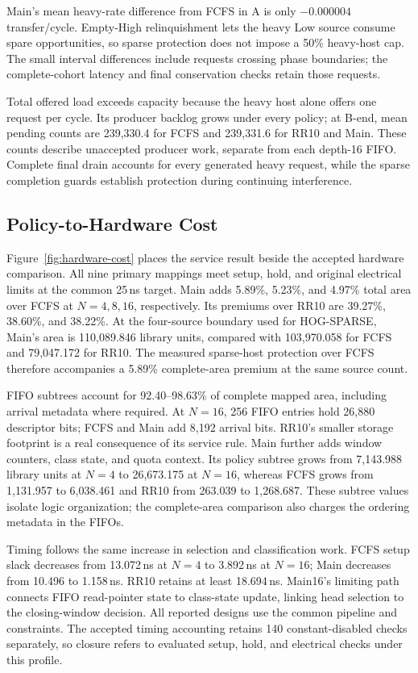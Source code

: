 Main's mean heavy-rate difference from FCFS in A is only $-0.000004$
transfer/cycle. Empty-High relinquishment lets the heavy Low source consume
spare opportunities, so sparse protection does not impose a 50\% heavy-host
cap. The small interval differences include requests crossing phase boundaries;
the complete-cohort latency and final conservation checks retain those requests.

Total offered load exceeds capacity because the heavy host alone offers one
request per cycle. Its producer backlog grows under every policy; at B-end,
mean pending counts are 239,330.4 for FCFS and 239,331.6 for RR10 and Main.
These counts describe unaccepted producer work, separate from each depth-16
FIFO. Complete final drain accounts for every generated heavy request, while
the sparse completion guards establish protection during continuing interference.

\subsection{Policy-to-Hardware Cost}
Figure~\ref{fig:hardware-cost} places the service result beside the accepted
hardware comparison. All nine primary mappings meet setup, hold, and original
electrical limits at the common 25\,ns target. Main adds 5.89\%, 5.23\%, and
4.97\% total area over FCFS at $N=4,8,16$, respectively. Its premiums over
RR10 are 39.27\%, 38.60\%, and 38.22\%. At the four-source boundary used
for HOG-SPARSE, Main's area is 110,089.846 library units, compared with
103,970.058 for FCFS and 79,047.172 for RR10. The measured sparse-host
protection over FCFS therefore accompanies a 5.89\% complete-area premium
at the same source count.



FIFO subtrees account for 92.40--98.63\% of complete mapped area, including
arrival metadata where required. At $N=16$, 256 FIFO entries hold 26,880
descriptor bits; FCFS and Main add 8,192 arrival bits. RR10's smaller
storage footprint is a real consequence of its service rule. Main further
adds window counters, class state, and quota context. Its policy subtree
grows from 7,143.988 library units at $N=4$ to 26,673.175 at $N=16$,
whereas FCFS grows from 1,131.957 to 6,038.461 and RR10 from 263.039
to 1,268.687. These subtree values isolate logic organization; the
complete-area comparison also charges the ordering metadata in the FIFOs.

Timing follows the same increase in selection and classification work.
FCFS setup slack decreases from 13.072\,ns at $N=4$ to 3.892\,ns at
$N=16$; Main decreases from 10.496 to 1.158\,ns. RR10 retains at least
18.694\,ns. Main16's limiting path connects FIFO read-pointer state to
class-state update, linking head selection to the closing-window decision.
All reported designs use the common pipeline and constraints. The accepted
timing accounting retains 140 constant-disabled checks separately, so closure
refers to evaluated setup, hold, and electrical checks under this profile.

